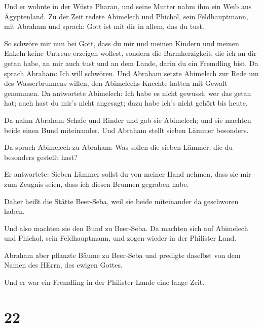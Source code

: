  Und er wohnte in der Wüste Pharan, und seine Mutter nahm
ihm ein Weib aus Ägyptenland.  Zu der Zeit redete Abimelech
und Phichol, sein Feldhauptmann, mit Abraham und sprach: Gott ist mit
dir in allem, das du tust.

 So schwöre mir nun bei Gott, dass du mir und meinen
Kindern und meinen Enkeln keine Untreue erzeigen wollest, sondern die
Barmherzigkeit, die ich an dir getan habe, an mir auch tust und an dem
Lande, darin du ein Fremdling bist.  Da sprach Abraham: Ich
will schwören.  Und Abraham setzte Abimelech zur Rede um
des Wasserbrunnens willen, den Abimelechs Knechte hatten mit Gewalt
genommen.  Da antwortete Abimelech: Ich habe es nicht
gewusst, wer das getan hat; auch hast du mir's nicht angesagt; dazu habe
ich's nicht gehört bis heute.

 Da nahm Abraham Schafe und Rinder und gab sie Abimelech;
und sie machten beide einen Bund miteinander.  Und Abraham
stellt sieben Lämmer besonders.

 Da sprach Abimelech zu Abraham: Was sollen die sieben
Lämmer, die du besonders gestellt hast?

 Er antwortete: Sieben Lämmer sollst du von meiner Hand
nehmen, dass sie mir zum Zeugnis seien, dass ich diesen Brunnen gegraben
habe.

 Daher heißt die Stätte Beer-Seba, weil sie beide
miteinander da geschworen haben.

 Und also machten sie den Bund zu Beer-Seba. Da machten
sich auf Abimelech und Phichol, sein Feldhauptmann, und zogen wieder in
der Philister Land.

 Abraham aber pflanzte Bäume zu Beer-Seba und predigte
daselbst von dem Namen des HErrn, des ewigen Gottes.

 Und er war ein Fremdling in der Philister Lande eine lange
Zeit.

\hypertarget{section-3}{%
\section{22}\label{section-3}}


